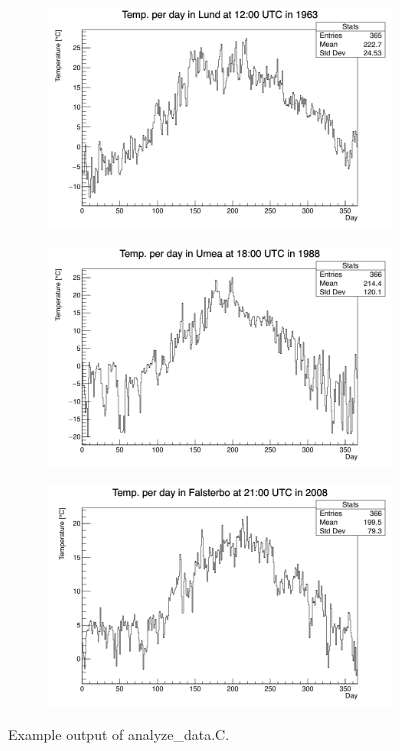 \documentclass{article}
\begin{document}
\begin{figure}[H]
\centering
\begin{subfigure}[h]{0.8\textwidth}
\centering
\includegraphics[width=\textwidth]{Lund12UTC1963.png} 
\caption{} \label{figAA}
\end{subfigure}

\begin{subfigure}[h]{0.8\textwidth}
\centering
\includegraphics[width=\textwidth]{Umea18UTC1988.png} 
\caption{} \label{figBB}
\end{subfigure}

\begin{subfigure}[h]{0.8\textwidth}
\centering
\includegraphics[width=\textwidth]{Falsterbo21UTC2008.png} 
\caption{} \label{figCC}
\end{subfigure}

\caption{Example output of analyze\_data.C.}
\end{figure}
\end{document}

